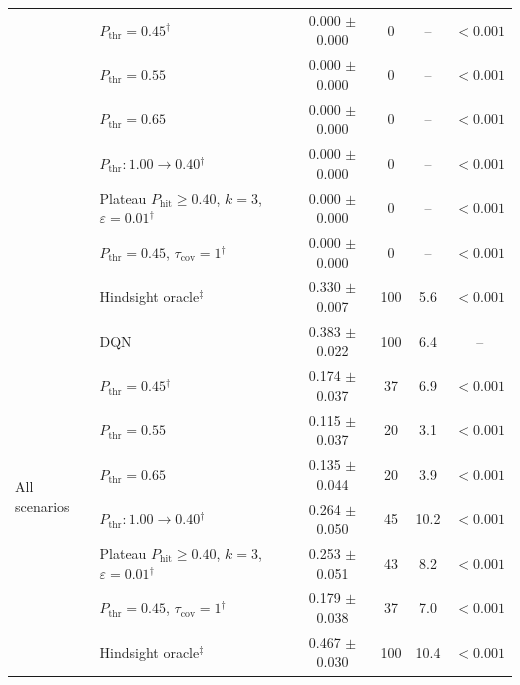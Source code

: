 \begin{table}[htbp]
\begin{tabular}{llcccc}
 & $P_{\mathrm{thr}}=0.45$$^{\dagger}$ & 0.000 $\pm$ 0.000 & 0 & -- & $<0.001$ \\
 & $P_{\mathrm{thr}}=0.55$ & 0.000 $\pm$ 0.000 & 0 & -- & $<0.001$ \\
 & $P_{\mathrm{thr}}=0.65$ & 0.000 $\pm$ 0.000 & 0 & -- & $<0.001$ \\
 & $P_{\mathrm{thr}}: 1.00 \to 0.40$$^{\dagger}$ & 0.000 $\pm$ 0.000 & 0 & -- & $<0.001$ \\
 & Plateau $P_{\mathrm{hit}}\geq0.40$, $k=3$, $\varepsilon=0.01$$^{\dagger}$ & 0.000 $\pm$ 0.000 & 0 & -- & $<0.001$ \\
 & $P_{\mathrm{thr}}=0.45$, $\tau_{\mathrm{cov}}=1$$^{\dagger}$ & 0.000 $\pm$ 0.000 & 0 & -- & $<0.001$ \\
 & Hindsight oracle$^{\ddagger}$ & 0.330 $\pm$ 0.007 & 100 & 5.6 & $<0.001$ \\
\midrule
\multirow{8}{*}{All scenarios} & DQN & 0.383 $\pm$ 0.022 & 100 & 6.4 & -- \\
 & $P_{\mathrm{thr}}=0.45$$^{\dagger}$ & 0.174 $\pm$ 0.037 & 37 & 6.9 & $<0.001$ \\
 & $P_{\mathrm{thr}}=0.55$ & 0.115 $\pm$ 0.037 & 20 & 3.1 & $<0.001$ \\
 & $P_{\mathrm{thr}}=0.65$ & 0.135 $\pm$ 0.044 & 20 & 3.9 & $<0.001$ \\
 & $P_{\mathrm{thr}}: 1.00 \to 0.40$$^{\dagger}$ & 0.264 $\pm$ 0.050 & 45 & 10.2 & $<0.001$ \\
 & Plateau $P_{\mathrm{hit}}\geq0.40$, $k=3$, $\varepsilon=0.01$$^{\dagger}$ & 0.253 $\pm$ 0.051 & 43 & 8.2 & $<0.001$ \\
 & $P_{\mathrm{thr}}=0.45$, $\tau_{\mathrm{cov}}=1$$^{\dagger}$ & 0.179 $\pm$ 0.038 & 37 & 7.0 & $<0.001$ \\
 & Hindsight oracle$^{\ddagger}$ & 0.467 $\pm$ 0.030 & 100 & 10.4 & $<0.001$ \\
\bottomrule
\end{tabular}
\end{table}
